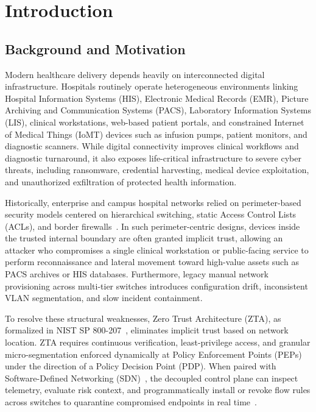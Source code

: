 \chapter{Introduction}
\label{ch:introduction}

\section{Background and Motivation}
\label{sec:background}

Modern healthcare delivery depends heavily on interconnected digital infrastructure. Hospitals routinely operate heterogeneous environments linking Hospital Information Systems (HIS), Electronic Medical Records (EMR), Picture Archiving and Communication Systems (PACS), Laboratory Information Systems (LIS), clinical workstations, web-based patient portals, and constrained Internet of Medical Things (IoMT) devices such as infusion pumps, patient monitors, and diagnostic scanners. While digital connectivity improves clinical workflows and diagnostic turnaround, it also exposes life-critical infrastructure to severe cyber threats, including ransomware, credential harvesting, medical device exploitation, and unauthorized exfiltration of protected health information.

Historically, enterprise and campus hospital networks relied on perimeter-based security models centered on hierarchical switching, static Access Control Lists (ACLs), and border firewalls~\cite{ciscoCampusArchitecture,ciscoHealthcareProfile}. In such perimeter-centric designs, devices inside the trusted internal boundary are often granted implicit trust, allowing an attacker who compromises a single clinical workstation or public-facing service to perform reconnaissance and lateral movement toward high-value assets such as PACS archives or HIS databases. Furthermore, legacy manual network provisioning across multi-tier switches introduces configuration drift, inconsistent VLAN segmentation, and slow incident containment.

To resolve these structural weaknesses, Zero Trust Architecture (ZTA), as formalized in NIST SP 800-207~\cite{rose2020zerotrust}, eliminates implicit trust based on network location. ZTA requires continuous verification, least-privilege access, and granular micro-segmentation enforced dynamically at Policy Enforcement Points (PEPs) under the direction of a Policy Decision Point (PDP). When paired with Software-Defined Networking (SDN)~\cite{onfSdnDefinition}, the decoupled control plane can inspect telemetry, evaluate risk context, and programmatically install or revoke flow rules across switches to quarantine compromised endpoints in real time~\cite{xu2025zero}.

